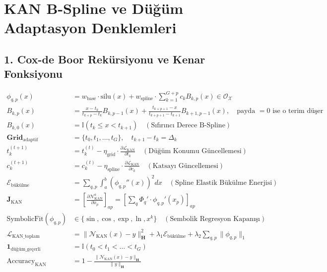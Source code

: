 \documentclass[11pt, a4paper]{article}
\begin{document}
\section{KAN B-Spline ve Düğüm Adaptasyon Denklemleri}

\subsection{1. Cox-de Boor Rekürsiyonu ve Kenar Fonksiyonu}
\begin{align}
\phi_{q,p}(x) &= w_{\text{base}} \cdot \text{silu}(x) + w_{\text{spline}} \cdot \sum_{k=1}^{G+p} c_k B_{k,p}(x) \in \mathcal{O}_{\mathcal{X}} \\
B_{k,p}(x) &= \frac{x - t_k}{t_{k+p} - t_k} B_{k, p-1}(x) + \frac{t_{k+p+1} - x}{t_{k+p+1} - t_{k+1}} B_{k+1, p-1}(x), \quad \text{payda } = 0 \text{ ise o terim düşer} \\
B_{k, 0}(x) &= \mathbb{I}(t_k \le x < t_{k+1}) \quad (\text{Sıfırıncı Derece B-Spline}) \\
\mathbf{Grid}_{\text{adaptif}} &= \{t_0, t_1, \dots, t_G\}, \quad t_{k+1} - t_k = \Delta_k \\
t_k^{(t+1)} &= t_k^{(t)} - \eta_{\text{grid}} \cdot \frac{\partial \mathcal{L}_{\text{KAN}}}{\partial t_k} \quad (\text{Düğüm Konumu Güncellemesi}) \\
c_k^{(t+1)} &= c_k^{(t)} - \eta_{\text{spline}} \cdot \frac{\partial \mathcal{L}_{\text{KAN}}}{\partial c_k} \quad (\text{Katsayı Güncellemesi}) \\
\mathcal{E}_{\text{bükülme}} &= \sum_{q,p} \int_a^b \left( \phi_{q,p}''(x) \right)^2 dx \quad (\text{Spline Elastik Bükülme Enerjisi}) \\
\mathbf{J}_{\text{KAN}} &= \left[ \frac{\partial \mathcal{N}_{\text{KAN}}^a}{\partial x_p} \right]_{ap} = \left[ \sum_q \Phi_q' \cdot \phi_{q,p}'(x_p) \right]_{ap} \\
\text{SymbolicFit}(\phi_{q,p}) &\in \{ \sin, \cos, \exp, \ln, x^k \} \quad (\text{Sembolik Regresyon Kapanışı}) \\
\mathcal{L}_{\text{KAN\_toplam}} &= \|\mathcal{N}_{\text{KAN}}(x) - y\|_{\mathbf{H}}^2 + \lambda_1 \mathcal{E}_{\text{bükülme}} + \lambda_2 \sum_{q,p} \|\phi_{q,p}\|_1 \\
\mathbf{1}_{\text{düğüm\_geçerli}} &= \mathbb{I}\left( t_0 < t_1 < \dots < t_G \right) \\
\text{Accuracy}_{\text{KAN}} &= 1 - \frac{\|\mathcal{N}_{\text{KAN}}(x) - y\|_{\mathbf{H}}}{\|y\|_{\mathbf{H}}}
\end{align}
\end{document}
